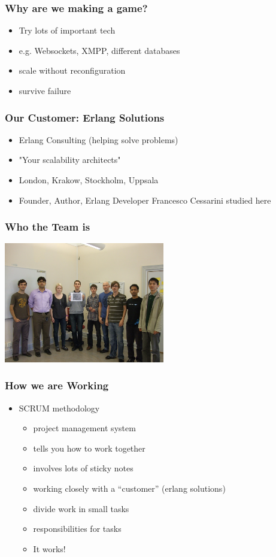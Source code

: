 \documentclass{beamer}
\begin{document}
\begin{frame}
  \frametitle{Why are we making a game?}
  \begin{itemize}
    \item Try lots of important tech
    \item e.g. Websockets, XMPP, different databases
    \item scale without reconfiguration
    \item survive failure
  \end{itemize}
\end{frame}

\begin{frame}
  \frametitle{Our Customer: Erlang Solutions}
  \begin{itemize}
    \item Erlang Consulting (helping solve problems)
    \item "Your scalability architects"
    \item London, Krakow, Stockholm, Uppsala
    \item Founder, Author, Erlang Developer Francesco Cessarini studied here
  \end{itemize}
\end{frame}

\begin{frame}
  \frametitle{Who the Team is}\begin{center}
  \includegraphics[width=7cm]{images/diplomacy/DSCF6545.jpg}
  \end{center}
\end{frame}

\begin{frame}
  \frametitle{How we are Working}
  \begin{itemize}
   \item SCRUM methodology
   \begin{itemize}
     \item project management system \pause
     \item tells you how to work together \pause
     \item involves lots of sticky notes \pause
     \item working closely with a ``customer'' (erlang solutions) \pause
     \item divide work in small tasks \pause
     \item responsibilities for tasks \pause
     \item It works!
   \end{itemize}
  \end{itemize}

\end{frame}
\end{document}
